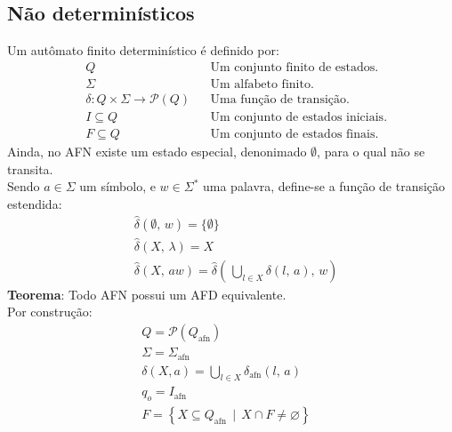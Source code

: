 \documentclass[11pt]{article}
\begin{document}
\subsection{Não determinísticos}
\label{sec:org60f4853}
Um autômato finito determinístico é definido por:
\begin{align*}
  & Q && \text{Um conjunto finito de estados.} \\
  & \Sigma && \text{Um alfabeto finito.} \\
  & \delta: Q \times \Sigma \to \mathcal{P}(Q) && \text{Uma função de transição.} \\
  & I \subseteq Q && \text{Um conjunto de estados iniciais.} \\
  & F \subseteq Q && \text{Um conjunto de estados finais.}
\end{align*}
Ainda, no AFN existe um estado especial, denonimado \(\emptyset\), para o qual não se
transita. \\
Sendo \(a \in \Sigma\) um símbolo, e \(w \in \Sigma^*\) uma palavra, define-se a função de
transição estendida:
\begin{align*}
  & \hat{\delta}(\emptyset,\, w) = \{\emptyset\} \\[5pt]
  & \hat{\delta}(X,\, \lambda) = X \\[5pt]
  & \hat{\delta}(X,\, aw) = \hat{\delta}\left(\,\bigcup_{l \in X} \delta(l,\, a),\, w \right)
\end{align*}
\textbf{Teorema}: Todo AFN possui um AFD equivalente. \\
Por construção:
\begin{align*}
  & Q = \mathcal{P}(Q_{\text{afn}}) && \\
  & \Sigma = \Sigma_{\text{afn}} && \\
  & \delta(X, a) = \bigcup_{l \in X} \delta_{\text{afn}}(l,\, a) && \\
  & q_o = I_{\text{afn}} && \\
  & F = \left\{ X \subseteq Q_{\text{afn}} \,\mid\, X \cap F \neq \varnothing \right\}&&
\end{align*}
\end{document}
